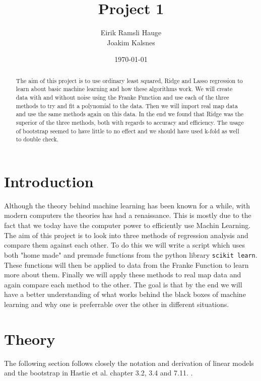 \documentclass[12pt]{article}
\title{Project 1}
\author{Eirik Ramsli Hauge\\
Joakim Kalsnes
}
\date{\today}
\begin{document}
\maketitle

\begin{abstract}
The aim of this project is to use ordinary least squared, Ridge and Lasso regression to learn about basic machine learning and how these algorithms work. We will create data with and without noise using the Franke Function and use each of the three methods to try and fit a polynomial to the data. Then we will import real map data and use the same methods again on this data. In the end we found that Ridge was the superior of the three methods, both with regards to accuracy and efficiency. The usage of bootstrap seemed to have little to no effect and we should have used k-fold as well to double check. 
\end{abstract}
\section{Introduction}   \label{s:i}
Although the theory behind machine learning has been known for a while, with modern computers the theories has had a renaissance. This is mostly due to the fact that we today have the computer power to efficiently use Machin Learning. The aim of this project is to look into three methods of regression analysis and compare them against each other. To do this we will write a script which uses both "home made" and premade functions from the python library \texttt{scikit learn}. These functions will then be applied to data from the Franke Function to learn more about them. Finally we will apply these methods to real map data and again compare each method to the other. The goal is that by the end we will have a better understanding of what works behind the black boxes of machine learning and why one is preferrable over the other in different situations.
\section{Theory} \label{s:t}
The following section follows closely the notation and derivation of linear models and the bootstrap in Hastie et al. chapter 3.2, 3.4 and 7.11. \cite{Hastie}.
\end{document}
